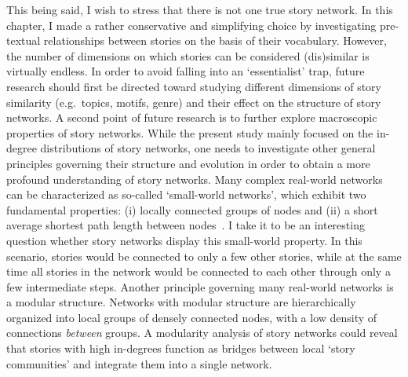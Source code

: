 This being said, I wish to stress that there is not one true story network. In this chapter, I made a rather conservative and simplifying choice by investigating pre-textual relationships between stories on the basis of their vocabulary. However, the number of dimensions on which stories can be considered (dis)similar is virtually endless. In order to avoid falling into an `essentialist' trap, future research should first be directed toward studying different dimensions of story similarity (e.g.\ topics, motifs, genre) and their effect on the structure of story networks\autocite[Cf.][]{abello:2012}. A second point of future research is to further explore macroscopic properties of story networks. While the present study mainly focused on the in-degree distributions of story networks, one needs to investigate other general principles governing their structure and evolution in order to obtain a more profound understanding of story networks. Many complex real-world networks can be characterized as so-called `small-world networks', which exhibit two fundamental properties: (i) locally connected groups of nodes and (ii) a short average shortest path length between nodes~\autocite{watts:1998,newman:2003}. I take it to be an interesting question whether story networks display this small-world property. In this scenario, stories would be connected to only a few other stories, while at the same time all stories in the network would be connected to each other through only a few intermediate steps. Another principle governing many real-world networks is a modular structure. Networks with modular structure are hierarchically organized into local groups of densely connected nodes, with a low density of connections \emph{between} groups\autocite{newman:2003}. A modularity analysis of story networks could reveal that stories with high in-degrees function as bridges between local `story communities' and integrate them into a single network\autocite{carron:2012}.